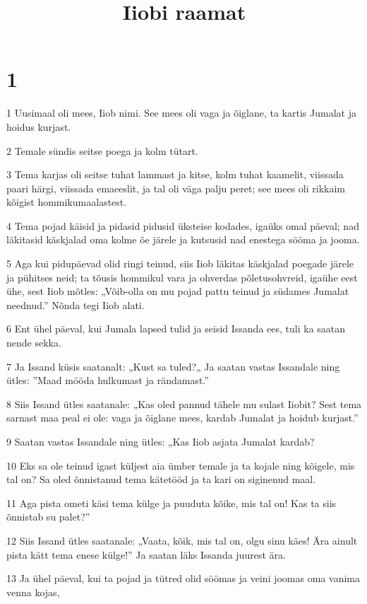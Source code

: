 

\title{Iiobi raamat}

\chapter{1}

\par 1 Uusimaal oli mees, Iiob nimi. See mees oli vaga ja õiglane, ta kartis Jumalat ja hoidus kurjast.
\par 2 Temale sündis seitse poega ja kolm tütart.
\par 3 Tema karjas oli seitse tuhat lammast ja kitse, kolm tuhat kaamelit, viissada paari härgi, viissada emaeeslit, ja tal oli väga palju peret; see mees oli rikkaim kõigist hommikumaalastest.
\par 4 Tema pojad käisid ja pidasid pidusid üksteise kodades, igaüks omal päeval; nad läkitasid käskjalad oma kolme õe järele ja kutsusid nad enestega sööma ja jooma.
\par 5 Aga kui pidupäevad olid ringi teinud, siis Iiob läkitas käskjalad poegade järele ja pühitses neid; ta tõusis hommikul vara ja ohverdas põletusohvreid, igaühe eest ühe, sest Iiob mõtles: „Võib-olla on mu pojad pattu teinud ja südames Jumalat neednud.” Nõnda tegi Iiob alati.
\par 6 Ent ühel päeval, kui Jumala lapsed tulid ja seisid Issanda ees, tuli ka saatan nende sekka.
\par 7 Ja Issand küsis saatanalt: „Kust sa tuled?„ Ja saatan vastas Issandale ning ütles: ”Maad mööda hulkumast ja rändamast.”
\par 8 Siis Issand ütles saatanale: „Kas oled pannud tähele mu sulast Iiobit? Sest tema sarnast maa peal ei ole: vaga ja õiglane mees, kardab Jumalat ja hoidub kurjast.”
\par 9 Saatan vastas Issandale ning ütles: „Kas Iiob asjata Jumalat kardab?
\par 10 Eks sa ole teinud igast küljest aia ümber temale ja ta kojale ning kõigele, mis tal on? Sa oled õnnistanud tema kätetööd ja ta kari on siginenud maal.
\par 11 Aga pista ometi käsi tema külge ja puuduta kõike, mis tal on! Kas ta siis õnnistab su palet?”
\par 12 Siis Issand ütles saatanale: „Vaata, kõik, mis tal on, olgu sinu käes! Ära ainult pista kätt tema enese külge!” Ja saatan läks Issanda juurest ära.
\par 13 Ja ühel päeval, kui ta pojad ja tütred olid söömas ja veini joomas oma vanima venna kojas,
